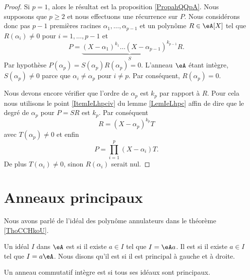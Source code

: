 \begin{proof}
    Si \( p=1\), alors le résultat est la proposition \ref{PropahQQpA}. Nous supposons que \( p\geq 2\) et nous effectuons une récurrence sur \( P\). Nous considérons donc pas \( p-1\) premières racines \( \alpha_1,\ldots, \alpha_{p-1}\) et un polynôme \( R\in\eA[X]\) tel que \( R(\alpha_i)\neq 0\) pour \( i=1,\ldots, p-1\) et
    \begin{equation}
        P=\underbrace{(X-\alpha_1)^{k_1}\ldots (X-\alpha_{p-1})^{k_{p-1}}}_SR.
    \end{equation}
    Par hypothèse \( P(\alpha_p)=S(\alpha_p)R(\alpha_p)=0\). L'anneau \( \eA\) étant intègre, \( S(\alpha_p)\neq 0\) parce que \( \alpha_i\neq \alpha_p\) pour \( i\neq p\). Par conséquent, \( R(\alpha_p)=0\).
    
    Nous devons encore vérifier que l'ordre de \( \alpha_p\) est \( k_p\) par rapport à \( R\). Pour cela nous utilisons le point \ref{ItemIeLhpciv} du lemme \ref{LemIeLhpc} affin de dire que le degré de \( \alpha_p\) pour \( P=SR\) est \( k_p\). Par conséquent
    \begin{equation}
        R=(X-\alpha_p)^{k_p}T
    \end{equation}
    avec \( T(\alpha_p)\neq 0\) et enfin
    \begin{equation}
        P=\prod_{i=1}^p(X-\alpha_i)T.
    \end{equation}
    De plus \( T(\alpha_i)\neq 0\), sinon \( R(\alpha_i)\) serait nul.
\end{proof}

\section{Anneaux principaux}

Nous avons parlé de l'idéal des polynôme annulateurs dans le théorème \ref{ThoCCHkoU}.

\begin{definition}      \label{DefIdPrinpuMrbOq}
    Un idéal \( I\) dans \(\eA\) est  si il existe \( a\in I\) tel que \( I=\eA a\). Il est  si il existe \( a\in I\) tel que \( I=a\eA\). Nous disons qu'il est  si il est principal à gauche et à droite.

    Un anneau commutatif intègre est  si tous ses idéaux sont principaux.
\end{definition}

